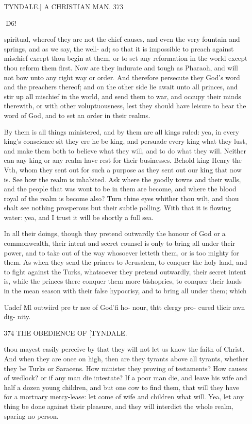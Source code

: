 \documentclass{custom}
\begin{document}
{TYNDALE.]
A CHRISTIAN MAN.
373

^^HD6! 

spiritual, whereof they are not the chief causes, and even 
the very fountain and springs, and as we say, the well- 
ad; so that it is impossible to preach against mischief 
except thou begin at them, or to set any reformation in 
the world except thou reform them first. Now are they 
indurate and tough as Pharaoh, and will not bow unto 
any right way or order. And therefore persecute they 
God's word and the preachers thereof; and on the other 
side lie await unto all princes, and stir up all mischief in 
the world, and send them to war, and occupy their minds 
therewith, or with other voluptuousness, lest they should 
have leisure to hear the word of God, and to set an order 
in their realms. 

By them is all things ministered, and by them are all 
kings ruled: yea, in every king's conscience sit they ere 
he be king, and persuade every king what they lust, and 
make them both to believe what they will, and to do what 
they will. Neither can any king or any realm have rest for 
their businesses. Behold king Henry the Vth, whom they 
sent out for such a purpose as they sent out our king that 
now is. See how the realm is inhabited. Ask where the 
goodly towns and their walls, and the people that was 
wont to be in them are become, and where the blood 
royal of the realm is become also? Turn thine eyes 
whither thou wilt, and thou shalt see nothing prosperous 
but their subtle polling. With that it is flowing water: 
yea, and I trust it will be shortly a full sea. 

In all their doings, though they pretend outwardly the 
honour of God or a commonwealth, their intent and 
secret counsel is only to bring all under their power, and 
to take out of the way whosoever letteth them, or is too 
mighty for them. As when they send the princes to 
Jerusalem, to conquer the holy land, and to fight against 
the Turks, whatsoever they pretend outwardly, their 
secret intent is, while the princes there conquer them more 
bishoprics, to conquer their lands in the mean season with 
their false hypocrisy, and to bring all under them; which 

Uadcf Ml 
outwiird 
pre tr nee of 
God'fi ho- 
nour, thtt 
clergy pro- 
cured tlicir 
awn dig- 
nity. 


374
THE OBEDIENCE OF
[TYNDALE.

thou mayest easily perceive by that they will not let us 
know the faith of Christ. And when they are once on 
high, then are they tyrants above all tyrants, whether they 
be Turks or Saracens. How minister they proving of 
testaments? How causes of wedlock? or if any man 
die intestate? If a poor man die, and leave his wife 
and half a dozen young children, and but one cow to find 
them, that will they have for a mortuary mercy-lease: let 
come of wife and children what will. Yea, let any thing 
be done against their pleasure, and they will interdict the 
whole realm, sparing no person. 

}
\end{document}
